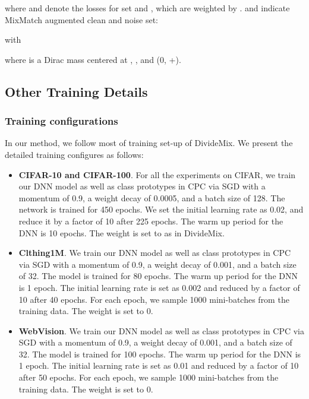 \documentclass{article} \usepackage{iclr2023_conference,times}
\begin{document}
where  and  denote the losses for set  and , which are weighted by .  and  indicate MixMatch \citep{berthelot2019mixmatch} augmented clean and noise set:

with

where  is a Dirac mass centered at , , and   (0, +).


\subsection{Other Training Details} \label{app:conig}
\subsubsection{Training configurations}
In our method, we follow most of training set-up of DivideMix\citep{Li2020DivideMixLW}. We present the detailed training configures as follows:
\begin{itemize}
    \item \textbf{CIFAR-10 and CIFAR-100}. For all the experiments on CIFAR, we train our DNN model as well as class prototypes in CPC via SGD with a momentum of 0.9, a weight decay of 0.0005, and a batch size of 128. The network is trained for 450 epochs. We set the initial learning rate as 0.02, and reduce it by a factor of 10 after 225 epochs. The warm up period for the DNN is 10 epochs. The weight  is set to  as in DivideMix.
    \item \textbf{Clthing1M}. We train our DNN model as well as class prototypes in CPC via SGD with a momentum of 0.9, a weight decay of 0.001, and a batch size of 32. The model is trained for 80 epochs. The warm up period for the DNN is 1 epoch. The initial learning rate is set as 0.002 and reduced by a factor of 10 after 40 epochs. For each epoch, we sample 1000 mini-batches from the training data. The weight  is set to 0.
    \item \textbf{WebVision}. We train our DNN model as well as class prototypes in CPC via SGD with a momentum of 0.9, a weight decay of 0.001, and a batch size of 32. The model is trained for 100 epochs. The warm up period for the DNN is 1 epoch. The initial learning rate is set as 0.01 and reduced by a factor of 10 after 50 epochs. For each epoch, we sample 1000 mini-batches from the training data. The weight  is set to 0.
\end{itemize}
\end{document}
